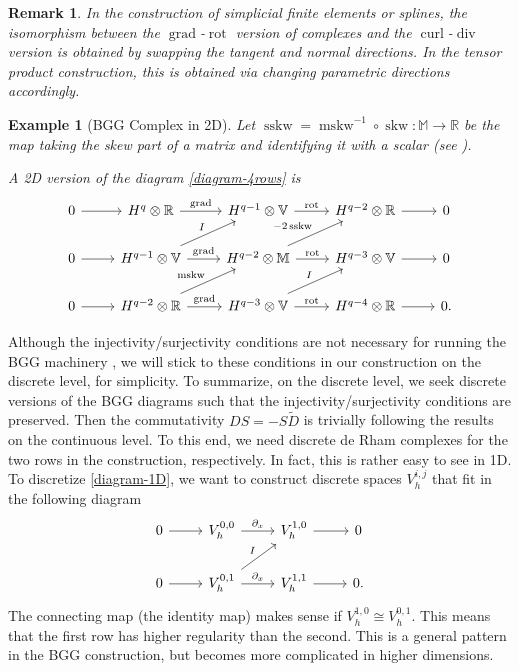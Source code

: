 \documentclass[final]{amsart}%
\newtheorem{remark}{Remark}
\newtheorem{example}{Example}
\newcommand{\0}{\mathaccent23}
\newcommand\skw{\operatorname{skw}}
\newcommand\sskw{\operatorname{sskw}}
\newcommand\mskw{\operatorname{mskw}}
\newcommand\grad{\operatorname{grad}}
\renewcommand\div{\operatorname{div}}
\newcommand\curl{\operatorname{curl}}
\newcommand\rot{\operatorname{rot}}
\begin{document}
\begin{remark}\label{isomorphic-cx}
In the construction of simplicial finite elements or splines, the isomorphism between the $\grad$-$\rot$ version of complexes and the $\curl$-$\div$ version is obtained by swapping the tangent and normal directions. In the tensor product construction, this is obtained via changing parametric directions accordingly. 
\end{remark}
 
\begin{example}[BGG Complex in 2D]
Let $\sskw=\mskw^{-1}\circ \skw: \mathbb{M}\to \mathbb{R}$ be the map taking the skew part of a matrix and identifying it with a scalar (see \cite{arnold2021complexes}).

A 2D version of the diagram \eqref{diagram-4rows} is
\begin{equation}\label{diagram-3rows2D}
\begin{tikzcd}
0 \arrow{r}  &H^{q}\otimes \mathbb{R} \arrow{r}{\grad} &H^{q-1}\otimes \mathbb{V} \arrow{r}{\rot} & H^{q-2}\otimes \mathbb{R} \arrow{r}{} & 0\\
0 \arrow{r} & H^{q-1}\otimes \mathbb{V} \arrow{r}{\grad}\arrow[ur, "I"] &H^{q-2}\otimes \mathbb{M} \arrow{r}{\rot}\arrow[ur, "-2\sskw"] & H^{q-3}\otimes \mathbb{V} \arrow{r}{} & 0\\
0 \arrow{r}  &H^{q-2}\otimes \mathbb{R} \arrow{r}{\grad}\arrow[ur, "\mskw"] &H^{q-3}\otimes \mathbb{V} \arrow{r}{\rot}\arrow[ur, "I"] & H^{q-4}\otimes \mathbb{R} \arrow{r}{} & 0.
 \end{tikzcd} 
\end{equation}
\end{example}

Although the injectivity/surjectivity conditions are not necessary for running the BGG machinery \cite{vcap2022bgg}, we will stick to these conditions in our construction on the discrete level, for simplicity. To summarize, on the discrete level, we seek discrete versions of the BGG diagrams such that the injectivity/surjectivity conditions are preserved. Then the commutativity $DS=-S\tilde{D}$ is trivially following the results on the continuous level. To this end, we need discrete de Rham complexes for the two rows in the construction, respectively. In fact, this is rather easy to see in 1D. To discretize \eqref{diagram-1D}, we want to construct discrete spaces $V_{h}^{i, j}$ that fit in the following diagram
 \begin{equation}\label{diagram-1D-h}
\begin{tikzcd}
0 \arrow{r} &V^{0, 0}_{h}  \arrow{r}{\partial_{x}} &V^{1, 0}_{h}\arrow{r}{} & 0\\
0 \arrow{r} &V^{0, 1}_{h}\arrow{r}{\partial_{x}} \arrow[ur, "I"]&V^{1, 1}_{h}  \arrow{r}{} & 0.
 \end{tikzcd}
\end{equation}
The connecting map (the identity map) makes sense if $V^{1, 0}_{h}\cong V^{0, 1}_{h}$. This means that the first row has higher regularity than the second. This is a general pattern in the BGG construction, but becomes more complicated in higher dimensions.
\end{document}

